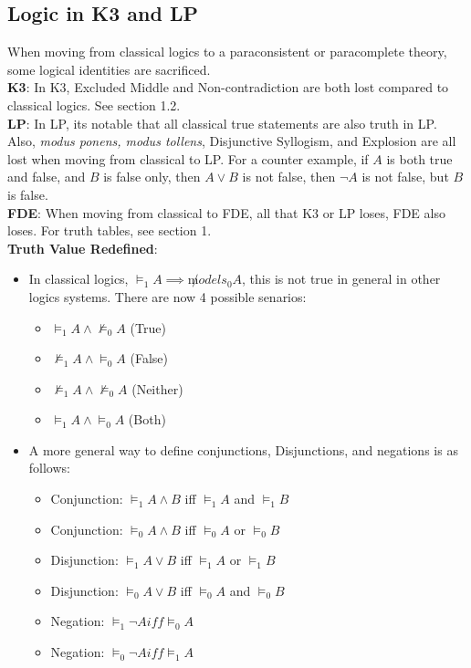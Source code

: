 \documentclass{article}
\begin{document}
\newpage
\subsection{Logic in K3 and LP}
When moving from classical logics to a paraconsistent or paracomplete theory, some logical identities are sacrificed.\\

\noindent \textbf{K3}: In K3, Excluded Middle and Non-contradiction are both lost compared to classical logics. See section 1.2.\\

\noindent \textbf{LP}: In LP, its notable that all classical true statements are also truth in LP. Also,
\emph{modus ponens, modus tollens}, Disjunctive Syllogism, and Explosion are all lost when moving from classical to LP.
For a counter example, if $A$ is both true and false, and $B$ is false only, then $A\vee B$ is not false, 
then $\lnot A$ is not false, but $B$ is false.\\

\noindent \textbf{FDE}: When moving from classical to FDE, all that K3 or LP loses, FDE also loses. For 
truth tables, see section 1.\\


\noindent \textbf{Truth Value Redefined}:
\begin{itemize}
    \item {In classical logics, $\models_1 A \implies \not models_0 A$, this is not true in general in other logics systems. There are now 4 possible senarios:
        \begin{itemize}
            \large
            \item $\models_1 A \wedge \not \models_0 A$ (True)
            \item $\not\models_1 A \wedge  \models_0 A$ (False)
            \item $\not \models_1 A \wedge \not \models_0 A$ (Neither)
            \item $\models_1 A \wedge \models_0 A$ (Both)
        \end{itemize}
    }
    \item {A more general way to define conjunctions, Disjunctions, and negations is as follows:
        \begin{itemize}
            \item Conjunction: $\models_1 A\wedge B$ iff $\models_1 A$ and $\models_1 B$
            \item Conjunction: $\models_0 A\wedge B$ iff $\models_0 A$ or $\models_0 B$\\
            \item Disjunction: $\models_1 A\vee B$ iff $\models_1 A$ or $\models_1 B$
            \item Disjunction: $\models_0 A\vee B$ iff $\models_0 A$ and $\models_0 B$\\
            \item Negation: $\models_1\lnot A iff \models_0A$
            \item Negation: $\models_0\lnot A iff \models_1A$
        \end{itemize}
    }
\end{itemize}
\end{document}
